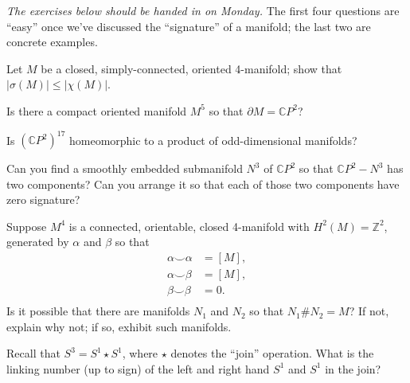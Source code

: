 \documentclass[12pt]{pset}
\author{Jim Fowler}
\date{Spring 2012}
\newcommand{\Z}{\mathbb{Z}}
\newcommand{\CP}{\mathbb{C}P}
\begin{document}
\maketitle

\textit{The exercises below should be handed in on Monday.}  The first four questions are ``easy'' once we've discussed the ``signature'' of a manifold; the last two are concrete examples.


\begin{problem}
  Let $M$ be a closed, simply-connected, oriented 4-manifold; show
  that $|\sigma(M)| \leq |\chi(M)|$.
\end{problem}

\begin{problem}
  Is there a compact oriented manifold $M^5$ so that $\partial M =
  \CP^2$?
\end{problem}

\begin{problem}
  Is $(\CP^2)^{17}$ homeomorphic to a product of odd-dimensional
  manifolds?
\end{problem}

\begin{problem}[Splitting]
  Can you find a smoothly embedded submanifold $N^3$ of $\CP^2$ so that $\CP^2 - N^3$ has two components?  Can you arrange it so that each of those two components have zero signature?
\end{problem}


\begin{problem}
  Suppose $M^4$ is a connected, orientable, closed 4-manifold with $H^2(M) = \Z^2$, generated by $\alpha$ and $\beta$ so that
\begin{align*}
\alpha  \smallsmile \alpha &= [M], \\
\alpha  \smallsmile \beta &= [M], \\
\beta  \smallsmile \beta &= 0. \\
\end{align*}
Is it possible that there are manifolds $N_1$ and $N_2$ so that $N_1
\# N_2 = M$?  If not, explain why not; if so, exhibit such manifolds.
\end{problem}

\begin{problem}
  Recall that $S^3 = S^1 \star S^1$, where $\star$ denotes the
  ``join'' operation.  What is the linking number (up to sign) of the
  left and right hand $S^1$ and $S^1$ in the join?
\end{problem}

\pagebreak
\null
\end{document}
